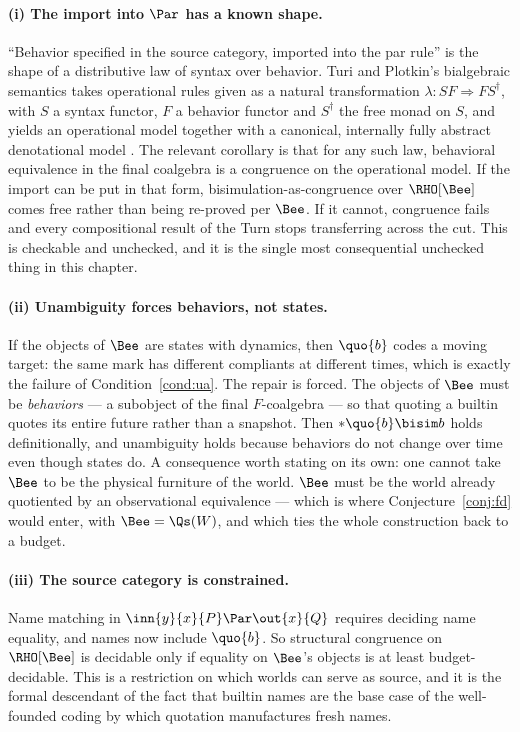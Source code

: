 \paragraph{(i) The import into $\Par$ has a known shape.}
``Behavior specified in the source category, imported into the par
rule'' is the shape of a distributive law of syntax over behavior.
Turi and Plotkin's bialgebraic semantics takes operational rules
given as a natural transformation $\lambda : SF \Rightarrow
FS^{\dagger}$, with $S$ a syntax functor, $F$ a behavior functor
and $S^{\dagger}$ the free monad on $S$, and yields an operational
model together with a canonical, internally fully abstract
denotational model \cite{turiplotkin}.
The relevant corollary is that for any such law, behavioral
equivalence in the final coalgebra is a congruence on the
operational model.
If the import can be put in that form, bisimulation-as-congruence
over $\RHO[\Bee]$ comes free rather than being re-proved per
$\Bee$.
If it cannot, congruence fails and every compositional result of
the Turn stops transferring across the cut.
This is checkable and unchecked, and it is the single most
consequential unchecked thing in this chapter.

\paragraph{(ii) Unambiguity forces behaviors, not states.}
If the objects of $\Bee$ are states with dynamics, then $\quo{b}$
codes a moving target: the same mark has different compliants at
different times, which is exactly the failure of
Condition~\ref{cond:ua}.
The repair is forced.
The objects of $\Bee$ must be \emph{behaviors} --- a subobject of
the final $F$-coalgebra --- so that quoting a builtin quotes its
entire future rather than a snapshot.
Then $*\quo{b} \bisim b$ holds definitionally, and unambiguity
holds because behaviors do not change over time even though states
do.
A consequence worth stating on its own: one cannot take $\Bee$ to
be the physical furniture of the world.
$\Bee$ must be the world already quotiented by an observational
equivalence --- which is where Conjecture~\ref{conj:fd} would
enter, with $\Bee = \Qs(W)$, and which ties the whole construction
back to a budget.

\paragraph{(iii) The source category is constrained.}
Name matching in $\inn{y}{x}{P} \Par \out{x}{Q}$ requires deciding
name equality, and names now include $\quo{b}$.
So structural congruence on $\RHO[\Bee]$ is decidable only if
equality on $\Bee$'s objects is at least budget-decidable.
This is a restriction on which worlds can serve as source, and it
is the formal descendant of the fact that builtin names are the
base case of the well-founded coding by which quotation
manufactures fresh names.

